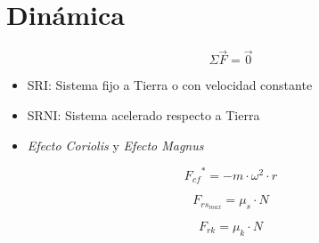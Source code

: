 
\section{Dinámica}
    \begin{equation}
        \Sigma\vec{F} = \vec{0}
    \end{equation}
    
    \begin{itemize}
        \item SRI: Sistema fijo a Tierra o con velocidad constante
        \item SRNI: Sistema acelerado respecto a Tierra
    \end{itemize}
    
    \newpage
    
    \begin{itemize}
        \item \textit{Efecto Coriolis} y \textit{Efecto Magnus}
    \end{itemize}
    \begin{equation}
        {{F_{cf}}}^* = - m \cdot \omega^2 \cdot r
    \end{equation}
    
    \begin{equation}
        F_{rs_{max}} = \mu_s \cdot N
    \end{equation}
    
    \begin{equation}
        F_{rk} = \mu_k \cdot N
    \end{equation}